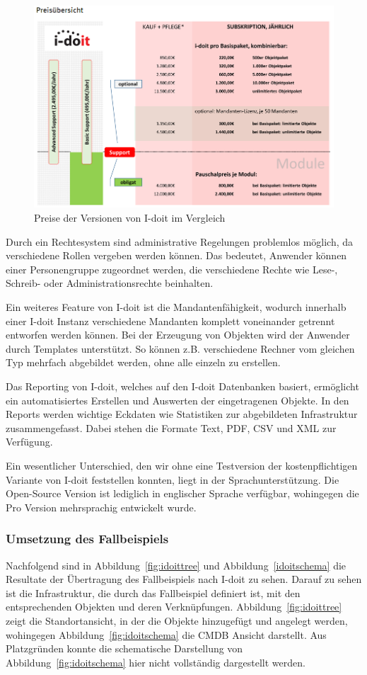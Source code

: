 \begin{figure}[htbp]
\includegraphics[width=\textwidth]{images/idoitpreis}
\caption{Preise der Versionen von I-doit im Vergleich}
\label{fig:idoitpreis}
\end{figure}

Durch ein Rechtesystem sind administrative Regelungen problemlos möglich, da verschiedene Rollen vergeben werden können.
Das bedeutet, Anwender können einer Personengruppe zugeordnet werden, die verschiedene Rechte wie Lese-, Schreib- oder Administrationsrechte beinhalten.

Ein weiteres Feature von I-doit ist die Mandantenfähigkeit, wodurch innerhalb einer I-doit Instanz verschiedene Mandanten komplett voneinander getrennt entworfen werden können.
Bei der Erzeugung von Objekten wird der Anwender durch Templates unterstützt.
So können z.B. verschiedene Rechner vom gleichen Typ mehrfach abgebildet werden, ohne alle einzeln zu erstellen.

Das Reporting von I-doit, welches auf den I-doit Datenbanken basiert, ermöglicht ein automatisiertes Erstellen und Auswerten der eingetragenen Objekte.
In den Reports werden wichtige Eckdaten wie Statistiken zur abgebildeten Infrastruktur zusammengefasst.
Dabei stehen die Formate Text, PDF, CSV und XML zur Verfügung.

Ein wesentlicher Unterschied, den wir ohne eine Testversion der kostenpflichtigen Variante von I-doit feststellen konnten, liegt in der Sprachunterstützung.
Die Open-Source Version ist lediglich in englischer Sprache verfügbar, wohingegen die Pro Version mehrsprachig entwickelt wurde.


\subsubsection{Umsetzung des Fallbeispiels}
Nachfolgend sind in Abbildung~\ref{fig:idoittree} und Abbildung~\ref{idoitschema} die Resultate der Übertragung des Fallbeispiels nach I-doit zu sehen.
Darauf zu sehen ist die Infrastruktur, die durch das Fallbeispiel definiert ist, mit den entsprechenden Objekten und deren Verknüpfungen.
Abbildung~\ref{fig:idoittree} zeigt die Standortansicht, in der die Objekte hinzugefügt und angelegt werden, wohingegen Abbildung~\ref{fig:idoitschema} die CMDB Ansicht darstellt.
Aus Platzgründen konnte die schematische Darstellung von Abbildung~\ref{fig:idoitschema} hier nicht vollständig dargestellt werden.


